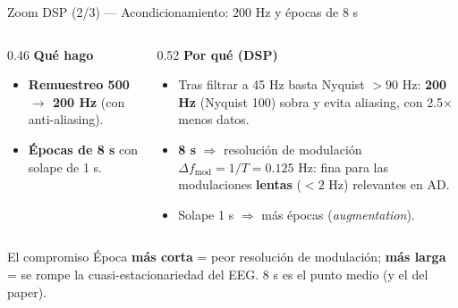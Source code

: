 \documentclass[aspectratio=169, 11pt]{beamer}
\begin{document}
\begin{frame}{Zoom DSP (2/3) --- Acondicionamiento: 200 Hz y épocas de 8 s}

\begin{columns}[T]
\begin{column}{0.46\textwidth}
\small\textbf{Qué hago}
\begin{itemize}
    \item \textbf{Remuestreo 500 $\to$ 200 Hz} (con anti-aliasing).
    \item \textbf{Épocas de 8 s} con solape de 1 s.
\end{itemize}
\end{column}
\begin{column}{0.52\textwidth}
\small\textbf{Por qué (DSP)}
\begin{itemize}
    \item Tras filtrar a 45 Hz basta Nyquist $>90$ Hz: \textbf{200 Hz}
    (Nyquist 100) sobra y evita aliasing, con 2.5$\times$ menos datos.
    \item \textbf{8 s} $\Rightarrow$ resolución de modulación
    $\Delta f_{\text{mod}} = 1/T = \mathbf{0.125}$ Hz: fina para las
    modulaciones \textbf{lentas} ($<2$ Hz) relevantes en AD.
    \item Solape 1 s $\Rightarrow$ más épocas (\emph{augmentation}).
\end{itemize}
\end{column}
\end{columns}

\vfill
\begin{block}{El compromiso}
\small Época \textbf{más corta} = peor resolución de modulación; \textbf{más
larga} = se rompe la cuasi-estacionariedad del EEG. 8 s es el punto medio
(y el del paper).
\end{block}

\end{frame}
\end{document}
